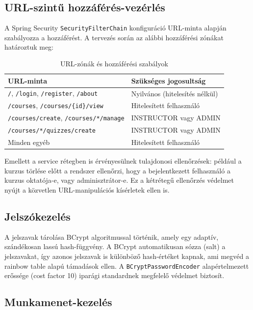 \subsection{URL-szintű hozzáférés-vezérlés}

A Spring Security \texttt{SecurityFilterChain} konfiguráció URL-minta alapján szabályozza a hozzáférést. A tervezés során az alábbi hozzáférési zónákat határoztuk meg:

\begin{table}[h]
\centering
\caption{URL-zónák és hozzáférési szabályok}
\label{tab:security}
\begin{tabular}{|l|l|}
\hline
\textbf{URL-minta} & \textbf{Szükséges jogosultság} \\
\hline
\texttt{/}, \texttt{/login}, \texttt{/register}, \texttt{/about} & Nyilvános (hitelesítés nélkül) \\
\texttt{/courses}, \texttt{/courses/\{id\}/view} & Hitelesített felhasználó \\
\texttt{/courses/create}, \texttt{/courses/*/manage} & INSTRUCTOR vagy ADMIN \\
\texttt{/courses/*/quizzes/create} & INSTRUCTOR vagy ADMIN \\
Minden egyéb & Hitelesített felhasználó \\
\hline
\end{tabular}
\end{table}

Emellett a service rétegben is érvényesülnek tulajdonosi ellenőrzések: például a kurzus törlése előtt a rendszer ellenőrzi, hogy a bejelentkezett felhasználó a kurzus oktatója-e, vagy adminisztrátor-e. Ez a kétrétegű ellenőrzés védelmet nyújt a közvetlen URL-manipulációs kísérletek ellen is.

\subsection{Jelszókezelés}

A jelszavak tárolása BCrypt algoritmussal történik, amely egy adaptív, szándékosan lassú hash-függvény. A BCrypt automatikusan sózza (salt) a jelszavakat, így azonos jelszavak is különböző hash-értéket kapnak, ami megvéd a rainbow table alapú támadások ellen. A \texttt{BCryptPasswordEncoder} alapértelmezett erőssége (cost factor 10) iparági standardnek megfelelő védelmet biztosít.

\subsection{Munkamenet-kezelés}

